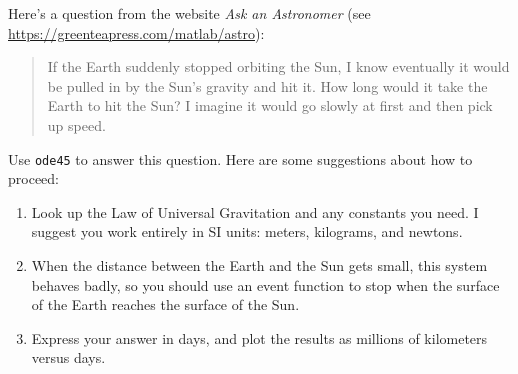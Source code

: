 \documentclass[../../book.tex]{subfiles}
\begin{document}
\begin{ex}
\label{earth}


Here's a question from the website \emph{Ask an Astronomer} (see \url{https://greenteapress.com/matlab/astro}):

\begin{quote}
If the Earth suddenly stopped orbiting the Sun, I know eventually it would be pulled in by the Sun's gravity and hit it. How long would it take the Earth to hit the Sun? I imagine it would go slowly at first and then pick up speed.
\end{quote}

Use \lstinline{ode45} to answer this question.  Here are some suggestions about how to proceed:

\begin{enumerate}

\item Look up the Law of Universal Gravitation and any constants you need. I suggest you work entirely in SI units: meters, kilograms, and newtons.

\item When the distance between the Earth and the Sun gets small, this system behaves badly, so you should use an event function to stop when the surface of the Earth reaches the surface of the Sun.

\item Express your answer in days, and plot the results as millions of kilometers versus days.

\end{enumerate}


\end{ex}
\end{document}
